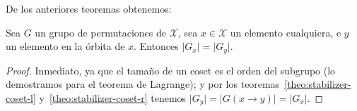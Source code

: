   De los anteriores teoremas obtenemos:
  \begin{corollary}
    \label{cor:G_x=G_y}
    Sea \(G\) un grupo de permutaciones de \(\mathcal{X}\),
    sea \(x \in \mathcal{X}\) un elemento cualquiera,
    e \(y\) un elemento en la órbita de \(x\).
    Entonces \(\lvert G_x \rvert = \lvert G_y \rvert\).
  \end{corollary}
  \begin{proof}
    Inmediato,
    ya que el tamaño de un coset es el orden del subgrupo
    (lo demostramos para el teorema de Lagrange);%
    y por los teoremas~\ref{theo:stabilizer-coset-l}
    y~\ref{theo:stabilizer-coset-r} tenemos
    \(
      \lvert G_y \rvert
	= \lvert G(x \rightarrow y) \rvert
	= \lvert G_x \rvert
    \).
  \end{proof}

